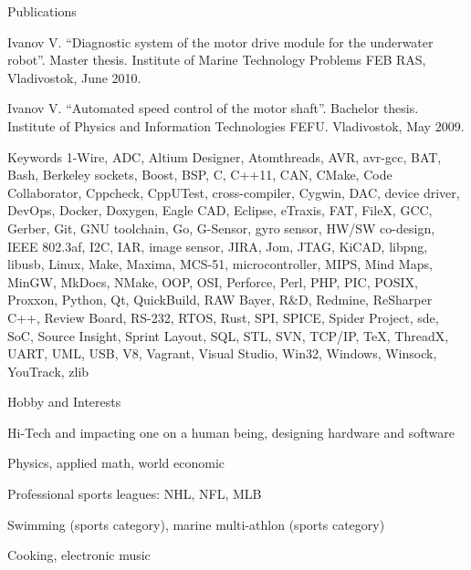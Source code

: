 \documentclass{template}
\begin{document}

\begin{rSection}{Publications}
\begin{rItemize}
\item Ivanov V. \textquotedblleft Diagnostic system of the motor drive module for the underwater robot\textquotedblright. Master thesis. Institute of Marine Technology Problems FEB RAS, Vladivostok, June 2010.
\item Ivanov V. \textquotedblleft Automated speed control of the motor shaft\textquotedblright. Bachelor thesis. \newline Institute of Physics and Information Technologies FEFU. Vladivostok, May 2009.
\end{rItemize}
\end{rSection}


\begin{rSection}{Keywords}
1-Wire, ADC, Altium Designer, Atomthreads, AVR, avr-gcc, BAT, Bash, Berkeley sockets, Boost, BSP, C, C++11, CAN, CMake, Code Collaborator, Cppcheck, CppUTest, cross-compiler, Cygwin, DAC, device driver, DevOps, Docker, Doxygen, Eagle CAD, Eclipse, eTraxis, FAT, FileX, GCC, Gerber, Git, GNU toolchain, Go, G-Sensor, gyro sensor, HW/SW co-design, IEEE 802.3af, I2C, IAR, image sensor, JIRA, Jom, JTAG, KiCAD, libpng, libusb, Linux, Make, Maxima, MCS-51, microcontroller, MIPS, Mind Maps, MinGW, MkDocs, NMake, OOP, OSI, Perforce, Perl, PHP, PIC, POSIX, Proxxon, Python, Qt, QuickBuild, RAW Bayer, R\&D, Redmine, ReSharper C++, Review Board, RS-232, RTOS, Rust, SPI, SPICE, Spider Project, sde, SoC, Source Insight, Sprint Layout, SQL, STL, SVN, TCP/IP, \TeX, ThreadX, UART, UML, USB, V8, Vagrant, Visual Studio, Win32, Windows, Winsock, YouTrack, zlib
\end{rSection}


\begin{rSection}{Hobby and Interests}
\begin{rHobby}
\item Hi-Tech and impacting one on a human being, designing hardware and software
\item Physics, applied math, world economic
\item Professional sports leagues: NHL, NFL, MLB
\item Swimming (sports category), marine multi-athlon (sports category)
\item Cooking, electronic music
\end{rHobby}
\end{rSection}
\end{document}
